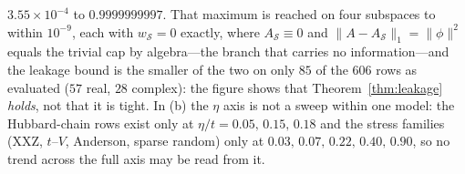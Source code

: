 {$3.55\times10^{-4}$ to $0.9999999997$. That maximum is reached on four subspaces to within $10^{-9}$, each with $w_{\mathcal
S}=0$ exactly, where $A_{\mathcal S}\equiv 0$ and $\|A-A_{\mathcal S}\|_1=\|\phi\|^{2}$ equals the
trivial cap by algebra---the branch that carries no information---and the leakage bound
is the smaller of the two on only $85$ of the $606$ rows as evaluated ($57$ real, $28$ complex): the
figure shows that Theorem~\ref{thm:leakage} \emph{holds}, not that it is tight. In (b) the $\eta$ axis is not a sweep
within one model: the Hubbard-chain rows exist only at $\eta/t=0.05,\,0.15,\,0.18$ and the stress
families (XXZ, $t$--$V$, Anderson, sparse random) only at $0.03,\,0.07,\,0.22,\,0.40,\,0.90$, so no
trend across the full axis may be read from it.}
\label{fig:thm1iii-violation}
